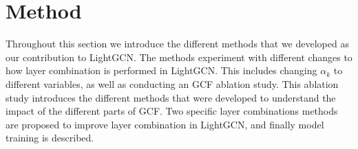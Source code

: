 \section{Method}
Throughout this section we introduce the different methods that we developed as our contribution to LightGCN.
The methods experiment with different changes to how layer combination is performed in LightGCN.
This includes changing $\alpha_k$ to different variables, as well as conducting an GCF ablation study. 
This ablation study introduces the different methods that were developed to understand the impact of the different parts of GCF.
Two specific layer combinations methods are proposed to improve layer combination in LightGCN, and finally model training is described.




